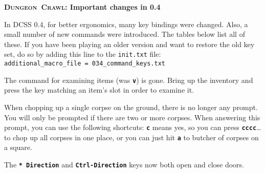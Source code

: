 \documentclass[a4paper,10pt]{article}
\newcommand{\key}[1]{{{\texttt{\textbf{#1}}}}} %
\newcommand{\crawl}{\textsc{Crawl}}
\newcommand{\dungeon}{\textsc{Dungeon}}
\newcommand{\para}{\vspace{1.5ex}}
\begin{document}
\begin{center}\textbf{\LARGE
\dungeon\ \crawl: Important changes in 0.4
}\end{center}

In DCSS 0.4, for better ergonomics, many key bindings were changed. Also,
a small number of new commands were introduced. The tables below list all 
of these. If you have been playing an older version and want to restore 
the old key set, do so by adding this line to the 
\texttt{init.txt} file: \\
\texttt{additional\_macro\_file = 034\_command\_keys.txt} 

\para

The command for examining items (was \key{v}) is gone. Bring up the
inventory and press the key matching an item's slot in order to examine it.

When chopping up a single corpse on the ground, there is no longer any
prompt. You will only be prompted if there are two or more corpses. When
answering this prompt, you can use the following shortcuts: \key{c} means 
yes, so you can press \key{cccc}\dots to chop up all corpses in one place,
or you can just hit \key{a} to butcher of corpses on a square.

The \key{* Direction} and \key{Ctrl-Direction} keys now both open and close
doors.

\para\para
\end{document}
